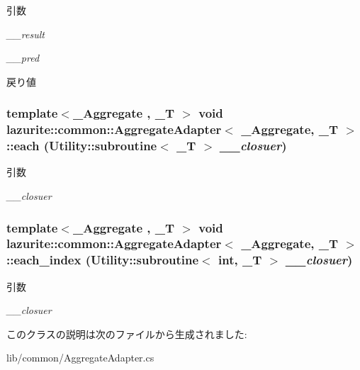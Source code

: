 \begin{DoxyParams}{引数}
\item[{\em \_\-\_\-result}]\item[{\em \_\-\_\-pred}]\end{DoxyParams}
\begin{DoxyReturn}{戻り値}

\end{DoxyReturn}
\hypertarget{classlazurite_1_1common_1_1_aggregate_adapter_3_01___aggregate_00_01___t_01_4_adf4cf7ca29f1384fa7f7cc2363a7ec7b}{
\subsubsection[{each}]{\setlength{\rightskip}{0pt plus 5cm}template$<$\_\-Aggregate , \_\-T $>$ void lazurite::common::AggregateAdapter$<$ \_\-Aggregate, \_\-T $>$::each (Utility::subroutine$<$ \_\-T $>$ {\em \_\-\_\-closuer})}}
\label{classlazurite_1_1common_1_1_aggregate_adapter_3_01___aggregate_00_01___t_01_4_adf4cf7ca29f1384fa7f7cc2363a7ec7b}

\begin{DoxyParams}{引数}
\item[{\em \_\-\_\-closuer}]\end{DoxyParams}
\hypertarget{classlazurite_1_1common_1_1_aggregate_adapter_3_01___aggregate_00_01___t_01_4_a671c6aa14225789354eb999f2c77fe7a}{
\subsubsection[{each\_\-index}]{\setlength{\rightskip}{0pt plus 5cm}template$<$\_\-Aggregate , \_\-T $>$ void lazurite::common::AggregateAdapter$<$ \_\-Aggregate, \_\-T $>$::each\_\-index (Utility::subroutine$<$ int, \_\-T $>$ {\em \_\-\_\-closuer})}}
\label{classlazurite_1_1common_1_1_aggregate_adapter_3_01___aggregate_00_01___t_01_4_a671c6aa14225789354eb999f2c77fe7a}

\begin{DoxyParams}{引数}
\item[{\em \_\-\_\-closuer}]\end{DoxyParams}


このクラスの説明は次のファイルから生成されました:\begin{DoxyCompactItemize}
\item 
lib/common/AggregateAdapter.cs\end{DoxyCompactItemize}
